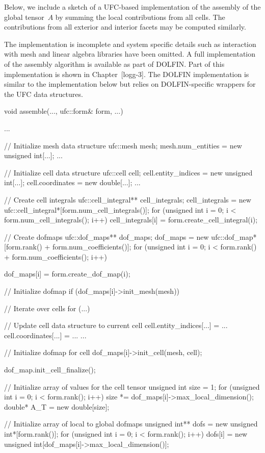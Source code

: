 Below, we include a sketch of a UFC-based implementation of the
assembly of the global tensor~$A$ by summing the local contributions
from all cells. The contributions from all exterior and interior
facets may be computed similarly.

The implementation is incomplete and system specific details such as
interaction with mesh and linear algebra libraries have been
omitted. A full implementation of the assembly algorithm is available
as part of DOLFIN. Part of this implementation is shown in
Chapter~[logg-3]. The DOLFIN implementation is similar to the
implementation below but relies on DOLFIN-specific wrappers for the
UFC data structures.

\begin{c++}
void assemble(..., ufc::form& form, ...)
{
  ...

  // Initialize mesh data structure
  ufc::mesh mesh;
  mesh.num_entities = new unsigned int[...];
  ...

  // Initialize cell data structure
  ufc::cell cell;
  cell.entity_indices = new unsigned int[...];
  cell.coordinates = new double[...];
  ...

  // Create cell integrals
  ufc::cell_integral** cell_integrals;
  cell_integrals = new ufc::cell_integral*[form.num_cell_integrals()];
  for (unsigned int i = 0; i < form.num_cell_integrals(); i++)
    cell_integrals[i] = form.create_cell_integral(i);

  // Create dofmaps
  ufc::dof_maps** dof_maps;
  dof_maps = new ufc::dof_map*[form.rank() + form.num_coefficients()];
  for (unsigned int i = 0; i < form.rank() + form.num_coefficients(); i++)
  {
    dof_maps[i] = form.create_dof_map(i);

    // Initialize dofmap
    if (dof_maps[i]->init_mesh(mesh))
    {
      // Iterate over cells
      for (...)
      {
        // Update cell data structure to current cell
        cell.entity_indices[...] = ...
        cell.coordinates[...] = ...
        ...

        // Initialize dofmap for cell
        dof_maps[i]->init_cell(mesh, cell);
      }

      dof_map.init_cell_finalize();
    }
  }

  // Initialize array of values for the cell tensor
  unsigned int size = 1;
  for (unsigned int i = 0; i < form.rank(); i++)
    size *= dof_maps[i]->max_local_dimension();
  double* A_T = new double[size];

  // Initialize array of local to global dofmaps
  unsigned int** dofs = new unsigned int*[form.rank()];
  for (unsigned int i = 0; i < form.rank(); i++)
    dofs[i] = new unsigned int[dof_maps[i]->max_local_dimension()];

}
\end{c++}
